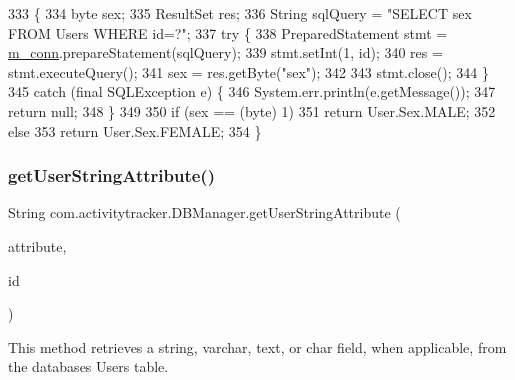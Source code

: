 \begin{DoxyCode}
333                                              \{
334         byte sex;
335         ResultSet res;
336         String sqlQuery = \textcolor{stringliteral}{"SELECT sex FROM Users WHERE id=?"};
337         \textcolor{keywordflow}{try} \{
338             PreparedStatement stmt = \mbox{\hyperlink{classcom_1_1activitytracker_1_1_d_b_manager_a064088d13ac09eb147fdc19268771521}{m\_conn}}.prepareStatement(sqlQuery);
339             stmt.setInt(1, \textcolor{keywordtype}{id});
340             res = stmt.executeQuery();
341             sex = res.getByte(\textcolor{stringliteral}{"sex"});
342 
343             stmt.close();
344         \}
345         \textcolor{keywordflow}{catch} (\textcolor{keyword}{final} SQLException e) \{
346             System.err.println(e.getMessage());
347             \textcolor{keywordflow}{return} null;
348         \}
349 
350         \textcolor{keywordflow}{if} (sex == (byte) 1)
351             \textcolor{keywordflow}{return} User.Sex.MALE;
352         \textcolor{keywordflow}{else}
353             \textcolor{keywordflow}{return} User.Sex.FEMALE;
354     \}
\end{DoxyCode}
\mbox{\label{classcom_1_1activitytracker_1_1_d_b_manager_a20f726c054d6c8a6fc3ce629d87f1114}} 
\subsubsection{\texorpdfstring{get\+User\+String\+Attribute()}{getUserStringAttribute()}}
{\footnotesize\ttfamily String com.\+activitytracker.\+D\+B\+Manager.\+get\+User\+String\+Attribute (\begin{DoxyParamCaption}\item[{final \mbox{\hyperlink{enumcom_1_1activitytracker_1_1_user_attribute}{User\+Attribute}}}]{attribute,  }\item[{final int}]{id }\end{DoxyParamCaption})}

This method retrieves a string, varchar, text, or char field, when applicable, from the database\textquotesingle{}s Users table.

